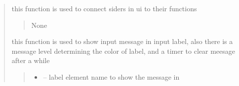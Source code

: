 \documentclass[letterpaper,10pt,english]{sphinxmanual}
\begin{document}
\begin{quote}
\begin{savenotes}
\begin{fulllineitems}
\begin{savenotes}
\begin{fulllineitems}
\end{fulllineitems}\end{savenotes}


\begin{savenotes}\begin{fulllineitems}
\label{\detokenize{setting/setting_UI:oxin.setting_UI.UI_main_window.set_sliders}}
\pysigstartsignatures
{}
\pysigstopsignatures
\sphinxAtStartPar
this function is used to connect siders in ui to their functions
\begin{quote}\begin{description}
\sphinxAtStartPar
None

\end{description}\end{quote}

\end{fulllineitems}\end{savenotes}


\begin{savenotes}\begin{fulllineitems}
\label{\detokenize{setting/setting_UI:oxin.setting_UI.UI_main_window.show_mesagges}}
\pysigstartsignatures
{}
\pysigstopsignatures
\sphinxAtStartPar
this function is used to show input message in input label, also there is a message level determining the color of label, and a timer to clear meesage after a while
\begin{quote}\begin{description}
\begin{itemize}
\item {} 
\sphinxAtStartPar
{} – label element name to show the message in


\end{itemize}
\end{description}
\end{quote}
\end{fulllineitems}
\end{savenotes}
\end{fulllineitems}
\end{savenotes}
\end{quote}
\end{document}
